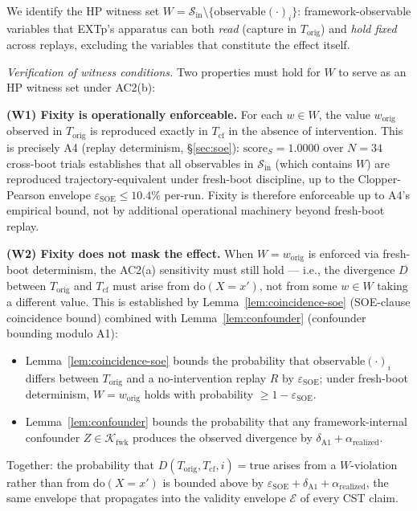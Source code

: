 \documentclass[conference]{IEEEtran}
\newcommand{\Korig}{T_\text{orig}}
\newcommand{\Tcf}{T_\text{cf}}
\newcommand{\Kfwk}{\mathcal{K}_\text{fwk}}
\newcommand{\arealized}{\alpha_\text{realized}}
\newcommand{\scoreS}{\text{score}_S}
\newcommand{\dox}[1]{\text{do}(X{=}#1)}
\newcommand{\epsSOE}{\varepsilon_\text{SOE}}
\begin{document}
We identify the HP witness set $W = \mathcal{S}_\text{in}
\setminus \{\text{observable}(\cdot)_i\}$: framework-observable
variables that EXTp's apparatus can both \emph{read} (capture in
$\Korig$) and \emph{hold fixed} across replays, excluding the
variables that constitute the effect itself.

\emph{Verification of witness conditions.} Two properties must
hold for $W$ to serve as an HP witness set under AC2(b):

\textbf{(W1) Fixity is operationally enforceable.} For each
$w \in W$, the value $w_{\text{orig}}$ observed in $\Korig$ is
reproduced exactly in $\Tcf$ in the absence of intervention. This
is precisely A4 (replay determinism, \S\ref{sec:soe}):
$\scoreS = 1.0000$ over $N{=}34$ cross-boot trials establishes
that all observables in $\mathcal{S}_\text{in}$ (which contains
$W$) are reproduced trajectory-equivalent under fresh-boot
discipline, up to the Clopper-Pearson envelope
$\epsSOE \leq 10.4\%$ per-run. Fixity is therefore enforceable
up to A4's empirical bound, not by additional operational
machinery beyond fresh-boot replay.

\textbf{(W2) Fixity does not mask the effect.} When
$W = w_{\text{orig}}$ is enforced via fresh-boot determinism, the
AC2(a) sensitivity must still hold --- i.e., the divergence $D$
between $\Korig$ and $\Tcf$ must arise from $\dox{x'}$, not from
some $w \in W$ taking a different value. This is established by
Lemma~\ref{lem:coincidence-soe} (SOE-clause coincidence bound)
combined with Lemma~\ref{lem:confounder} (confounder bounding
modulo A1):
\begin{itemize}[leftmargin=*]
  \item Lemma~\ref{lem:coincidence-soe} bounds the probability
    that $\text{observable}(\cdot)_i$ differs between $\Korig$
    and a no-intervention replay $R$ by $\epsSOE$; under
    fresh-boot determinism, $W = w_{\text{orig}}$ holds with
    probability $\geq 1 - \epsSOE$.
  \item Lemma~\ref{lem:confounder} bounds the probability that
    any framework-internal confounder $Z \in \Kfwk$ produces the
    observed divergence by $\delta_{\text{A1}} + \arealized$.
\end{itemize}
Together: the probability that $D(\Korig, \Tcf, i) = \text{true}$
arises from a $W$-violation rather than from $\dox{x'}$ is bounded
above by $\epsSOE + \delta_{\text{A1}} + \arealized$, the same
envelope that propagates into the validity envelope $\mathcal{E}$
of every CST claim.
\end{document}
